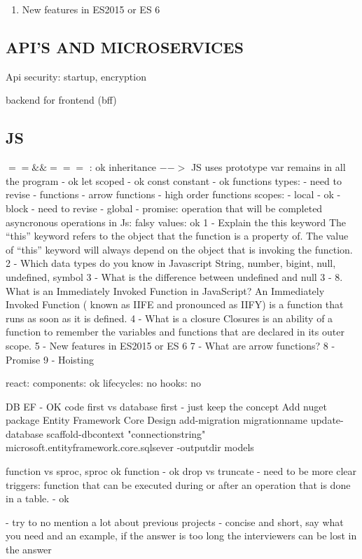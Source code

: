 \begin{multicols}{2}
\begin{enumerate}
\item New features in ES2015 or ES 6
\end{enumerate}

\subsection{API'S AND MICROSERVICES}
Api security: startup, encryption

backend for frontend (bff)

\subsection{JS}
$== \&\& ===$ : ok
inheritance $-->$ JS uses prototype
var remains in all the program - ok
let scoped - ok
const constant - ok
functions types: - need to revise
- functions
- arrow functions
- high order functions
scopes:
- local - ok
- block - need to revise
- global -
promise: operation that will be completed
asyncronous operations in Js:
falsy values: ok
1 - Explain the this keyword
The “this” keyword refers to the object that the function is a property of.
The value of “this” keyword will always depend on the object that is invoking the function.
2 - Which data types do you know in Javascript 
String, number, bigint, null, undefined, symbol  
3 - What is the difference between undefined and null
3 - 8. What is an Immediately Invoked Function in JavaScript?
An Immediately Invoked Function ( known as IIFE and pronounced as IIFY) is a function that runs as soon as it is defined.
4 - What is a closure
Closures is an ability of a function to remember the variables and functions that are declared in its outer scope.
5 - New features in ES2015 or ES 6
7 - What are arrow functions?
8 - Promise
9 - Hoisting


react:
components: ok
lifecycles: no
hooks: no

DB
EF - OK
code first vs database first - just keep the concept
Add nuget package Entity Framework Core Design
add-migration migrationname
update-database
scaffold-dbcontext "connectionstring" microsoft.entityframework.core.sqlsever -outputdir models

function vs sproc, sproc ok function - ok
drop vs truncate - need to be more clear
triggers: function that can be executed during or after an operation that is done in a table. - ok

- try to no mention a lot about previous projects
- concise and short, say what you need and an example, if the answer is too long the interviewers can be lost in the answer


\end{multicols}
